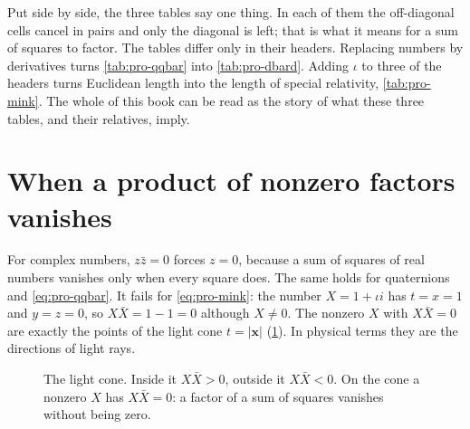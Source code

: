 


Put side by side, the three tables say one thing. In each of them the off-diagonal cells cancel in pairs and only the diagonal is left; that is what it means for a sum of squares to factor. The tables differ only in their headers. Replacing numbers by derivatives turns \cref{tab:pro-qqbar} into \cref{tab:pro-dbard}. Adding $\iota$ to three of the headers turns Euclidean length into the length of special relativity, \cref{tab:pro-mink}. The whole of this book can be read as the story of what these three tables, and their relatives, imply.

\section{When a product of nonzero factors vanishes}

For complex numbers, $z\bar z=0$ forces $z=0$, because a sum of squares of real numbers vanishes only when every square does. The same holds for quaternions and \eqref{eq:pro-qqbar}. It fails for \eqref{eq:pro-mink}: the number $X=1+\iota i$ has $t=x=1$ and $y=z=0$, so $X\bar X=1-1=0$ although $X\neq0$. The nonzero $X$ with $X\bar X=0$ are exactly the points of the light cone $t=|\mathbf x|$ (\cref{fig:pro-cone}). In physical terms they are the directions of light rays.

\begin{figure}[htbp]
  \centering
  \caption{The light cone. Inside it $X\bar X>0$, outside it $X\bar X<0$. On the cone a nonzero $X$ has $X\bar X=0$: a factor of a sum of squares vanishes without being zero.}
  \label{fig:pro-cone}
\end{figure}

